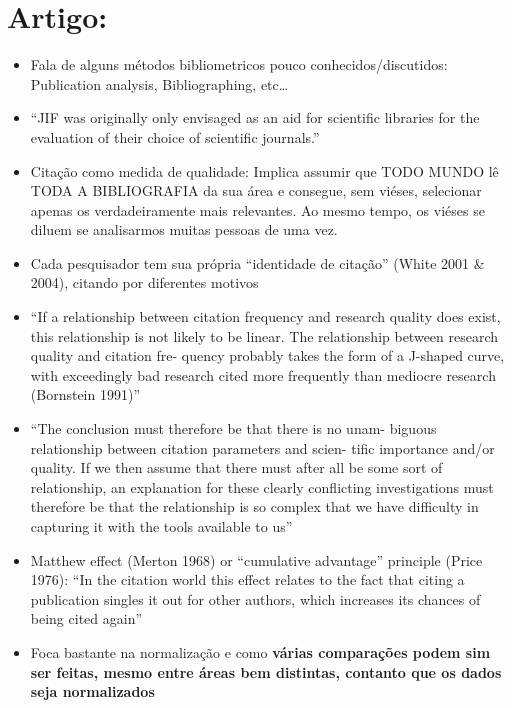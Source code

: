 \documentclass[11pt]{article}
\begin{document}
\section{Artigo: \cite{wallin2005}}
\label{sec:org9aa4ebc}
\begin{itemize}
\item Fala de alguns métodos bibliometricos pouco conhecidos/discutidos: Publication analysis, Bibliographing, etc\ldots{}
\item ``JIF was originally only envisaged as an aid for scientific libraries for the evaluation of their choice of scientific journals.''
\item Citação como medida de qualidade: Implica assumir que TODO MUNDO lê TODA A BIBLIOGRAFIA da sua área e consegue, sem viéses, selecionar apenas os verdadeiramente mais relevantes. Ao mesmo tempo, os viéses se diluem se analisarmos muitas pessoas de uma vez.
\item Cada pesquisador tem sua própria ``identidade de citação'' (White 2001 \& 2004), citando por diferentes motivos
\item ``If a relationship between citation frequency and research quality does exist, this relationship is not likely to be linear. The relationship between research quality and citation fre- quency probably takes the form of a J-shaped curve, with exceedingly bad research cited more frequently than mediocre research (Bornstein 1991)''
\item ``The conclusion must therefore be that there is no unam- biguous relationship between citation parameters and scien- tific importance and/or quality. If we then assume that there must after all be some sort of relationship, an explanation for these clearly conflicting investigations must therefore be that the relationship is so complex that we have difficulty in capturing it with the tools available to us''
\item Matthew effect (Merton 1968) or ``cumulative advantage'' principle (Price 1976): ``In the citation world this effect relates to the fact that citing a publication singles it out for other authors, which increases its chances of being cited again''
\item Foca bastante na normalização e como \textbf{várias comparações podem sim ser feitas, mesmo entre áreas bem distintas, contanto que os dados seja normalizados}
\end{itemize}
\end{document}
